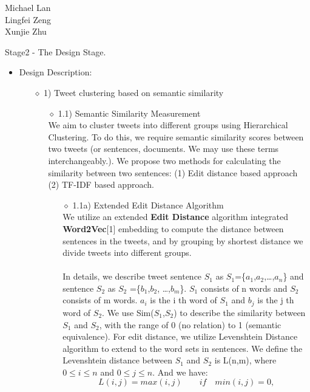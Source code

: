 \documentclass[10pt]{article}
\begin{document}
\begin{raggedright}
Michael Lan \\
Lingfei Zeng \\
Xunjie Zhu \\
\end{raggedright}

\vspace{5mm} 

Stage2 - The Design Stage. 
\begin{itemize} 
\item{ Design Description:\\} 
\begin{itemize}
There are three types of users who will use this system. We will begin with the first user type: 1) users who select a topic and bring up a cluster of tweets related to that topic.

\item[$\diamond$]{1) Tweet clustering based on semantic similarity}
\begin{itemize}
\item[$\diamond$]{1.1) Semantic Similarity Measurement}\\
We aim to cluster tweets into different groups using Hierarchical Clustering. To do this, we require semantic similarity scores between two tweets (or sentences, documents. We may use these terms interchangeably.).
We propose two methods for calculating the similarity between two sentences: (1) Edit distance based approach (2) TF-IDF based approach.


\begin{itemize}
\item[$\diamond$]{1.1a) Extended Edit Distance Algorithm}\\
We utilize an extended {\bf Edit Distance} algorithm integrated {\bf Word2Vec}[1] embedding to compute the distance between sentences in the tweets, and by grouping by shortest distance we divide tweets into different groups. \\\\
In details, we describe tweet sentence $S_1$ as $S_1$=\{$a_1$,$a_2$,…,$a_n$\} and sentence $S_2$ as $S_2$ =\{$b_1$,$b_2$, …,$b_m$\}. $S_1$ consists of n words and $S_2$ consists of m words. $a_i$ is the i th word of $S_1$ and $b_j$ is the j th word of $S_2$. We use Sim($S_1$,$S_2$) to describe the similarity between $S_1$ and $S_2$, with the range of 0 (no relation) to 1 (semantic equivalence). For edit distance, we utilize Levenshtein Distance algorithm to extend to the word sets in sentences. We define the Levenshtein distance between $S_1$ and $S_2$ is L(n,m), where  \(0\leq i\leq n\) and \(0\leq j\leq n\). And we have: \[L(i, j) = max(i, j)  \qquad   if \quad min(i,j)=0, \]  


\end{itemize}
\end{itemize}
\end{itemize}
\end{itemize}
\end{document}
